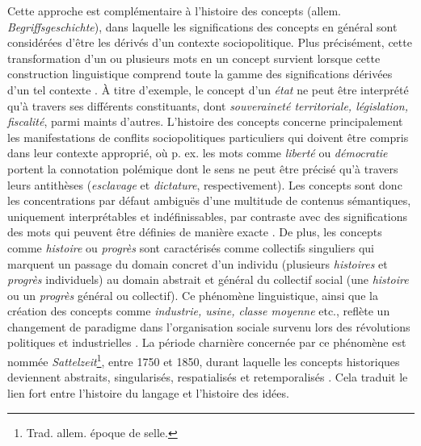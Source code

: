 Cette approche est complémentaire à l'histoire des concepts (allem. \textit{Begriffsgeschichte}), dans laquelle les significations des concepts en général sont considérées d'être les dérivés d'un contexte sociopolitique. Plus précisément, cette transformation d'un ou plusieurs mots en un concept survient lorsque cette construction linguistique comprend toute la gamme des significations dérivées d'un tel contexte \citep[p.~19]{koselleck2011introduction}. À titre d'exemple, le concept d'un \textit{état} ne peut être interprété qu'à travers ses différents constituants, dont \textit{souveraineté territoriale, législation, fiscalité}, parmi maints d'autres. L'histoire des concepts concerne principalement les manifestations de conflits sociopolitiques particuliers qui doivent être compris dans leur contexte approprié, où p. ex. les mots comme \textit{liberté} ou \textit{démocratie} portent la connotation polémique dont le sens ne peut être précisé qu'à travers leurs antithèses (\textit{esclavage} et \textit{dictature}, respectivement). Les concepts sont donc les concentrations par défaut ambiguës d'une multitude de contenus sémantiques, uniquement interprétables et indéfinissables, par contraste avec des significations des mots qui peuvent être définies de manière exacte \citep[p. 20]{koselleck2011introduction}. De plus, les concepts comme \textit{histoire} ou \textit{progrès} sont caractérisés comme \og{}collectifs singuliers\fg{} qui marquent un passage du domain concret d'un individu (plusieurs \textit{histoires} et \textit{progrès} individuels) au domain abstrait et général du collectif social (une \textit{histoire} ou un \textit{progrès} général ou collectif). Ce phénomène linguistique, ainsi que la création des concepts comme \textit{industrie, usine, classe moyenne} etc., reflète un changement de paradigme dans l'organisation sociale survenu lors des révolutions politiques et industrielles \citep[p. 1]{hobsbawm2010age}. La période charnière concernée par ce phénomène est nommée \textit{Sattelzeit}\footnote{Trad. allem. \og{}époque de selle\fg{}.}, entre 1750 et 1850, durant laquelle les concepts historiques deviennent abstraits, singularisés, respatialisés et retemporalisés \citep[pp.~34-35]{koselleck2011introduction}. Cela traduit le lien fort entre l'histoire du langage et l'histoire des idées.

